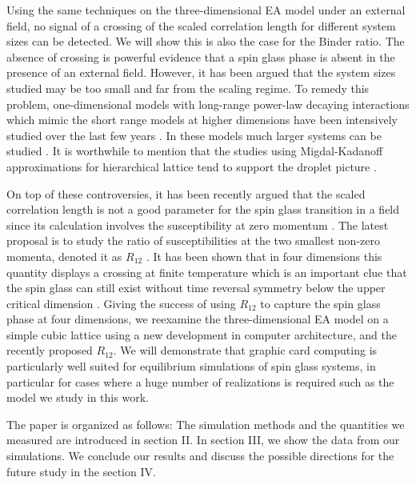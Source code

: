\documentclass[aps,prb,twocolumn,showpacs,superscriptaddress]{revtex4}
\begin{document}
Using the same techniques on the three-dimensional EA model under an external field, no signal of 
a crossing of the scaled correlation length for different system sizes can be 
detected\cite{Young-Katzgraber2004}.  We will show this is also 
the case for the Binder ratio.  The absence of crossing is powerful evidence that a spin
glass phase is absent in the presence of an external field. However, it has been 
argued that the system sizes studied may be too small and far from the scaling 
regime. To remedy this problem, one-dimensional models with long-range power-law 
decaying interactions \cite{Kotliar-Anderson-Stein-1983} which mimic the short range models 
at higher dimensions have been intensively studied over the last few years \cite{Katzgraber-Young-2003a,Katzgraber-Young-2003b,
Leuzzi-1999}. In these models much larger systems can be studied \cite{Katzgraber-Larson-Young-2009,
Katzgraber-Hartmann-2009,Leuzzi-etal-2008,Larson-etal-2013}. It is worthwhile to mention that
the studies using Migdal-Kadanoff approximations for hierarchical lattice
tend to support the droplet picture \cite{Moore-Bokil-Drossel-1998,Migliorini-Berker-1998}. 

On top of these controversies, it has been recently argued that the scaled correlation length 
is not a good parameter for the spin glass transition in a field since its calculation involves 
the susceptibility at zero momentum \cite{Leuzzi-etal-2008}.
The latest proposal is to study the ratio of susceptibilities at the 
two smallest non-zero momenta, denoted it as $R_{12}$ \cite{Banos-2012}. It has 
been shown that in four dimensions this quantity displays a crossing
at finite temperature which is an important clue that the spin glass can still 
exist without time reversal symmetry below the upper critical dimension \cite{Banos-2012}. 
Giving the success of using $R_{12}$ to capture the spin glass phase
at four dimensions, we reexamine the three-dimensional EA model on a simple cubic lattice using 
a new development in computer architecture, and the recently proposed $R_{12}$. 
We will demonstrate that graphic card computing is particularly well suited for 
equilibrium simulations of spin glass systems, in particular for cases where a huge number 
of realizations is required such as the model we study in this work. 

The paper is organized as follows: The simulation methods and the quantities we measured 
are introduced in section II. In section III, we show the data from our simulations.
We conclude our results and discuss the possible directions for the future study in the
section IV.
\end{document}
